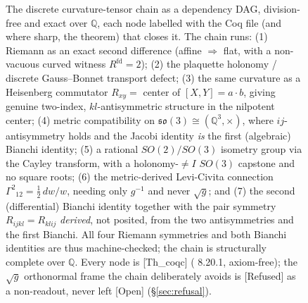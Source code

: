 \begin{figure}[t]
\caption{The discrete curvature-tensor chain as a dependency DAG, division-free and exact
over $\mathbb{Q}$, each node labelled with the Coq file (and where sharp, the theorem) that
closes it. The chain runs: (1) Riemann as an exact second difference (affine $\Rightarrow$
flat, with a non-vacuous curved witness $R^{\mathrm{fd}}=2$); (2) the plaquette holonomy /
discrete Gauss--Bonnet transport defect; (3) the same curvature as a Heisenberg commutator
$R_{xy}=$ center of $[X,Y]=a{\cdot}b$, giving genuine two-index, $kl$-antisymmetric structure
in the nilpotent center; (4) metric compatibility on $\mathfrak{so}(3)\cong(\mathbb{Q}^3,\times)$,
where $ij$-antisymmetry holds and the Jacobi identity \emph{is} the first (algebraic) Bianchi
identity; (5) a rational $SO(2)/SO(3)$ isometry group via the Cayley transform, with a
holonomy-$\ne I$ $SO(3)$ capstone and no square roots; (6) the metric-derived Levi-Civita
connection $\Gamma^{2}{}_{12}=\tfrac12\,dw/w$, needing only $g^{-1}$ and never $\sqrt{g}$; and
(7) the second (differential) Bianchi identity together with the pair symmetry
$R_{ijkl}=R_{klij}$ \emph{derived}, not posited, from the two antisymmetries and the first
Bianchi. All four Riemann symmetries and both Bianchi identities are thus machine-checked;
the chain is structurally complete over $\mathbb{Q}$. Every node is \textsf{[Th\_coqc]}
( 8.20.1, axiom-free); the $\sqrt{g}$ orthonormal frame the chain deliberately
avoids is \textsf{[Refused]} as a non-readout, never left \textsf{[Open]}
(\S\ref{sec:refusal}).}
\label{fig:curvature-dag}
\end{figure}
